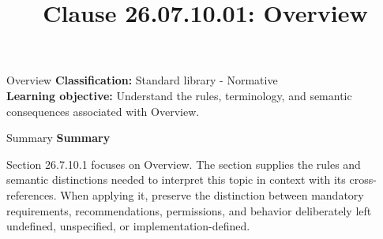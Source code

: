 \documentclass[10pt,letterpaper]{article}
\title{Clause 26.07.10.01: Overview}
\author{}
\date{}
\begin{document}
\maketitle
\begin{CornellOverviewBox}{Overview}
\textbf{Classification:} Standard library - Normative\\[2pt]
\textbf{Learning objective:} Understand the rules, terminology, and semantic consequences associated with Overview.
\end{CornellOverviewBox}\begin{CornellSummaryBox}{Summary}
{\sffamily\bfseries\color{Accent} Summary}\par\vspace{3pt}Section 26.7.10.1 focuses on Overview. The section supplies the rules and semantic distinctions needed to interpret this topic in context with its cross-references. When applying it, preserve the distinction between mandatory requirements, recommendations, permissions, and behavior deliberately left undefined, unspecified, or implementation-defined.
\end{CornellSummaryBox}
\end{document}
